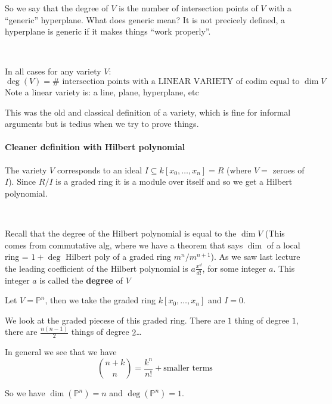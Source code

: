 So we say that the degree of $V$ is the number of intersection points of $V$ with a ``generic'' hyperplane. What does generic mean? It is not precicely defined, a hyperplane is generic if it makes things ``work properly''.

\
\begin{definition}
    In all cases for any variety $V$:\[
        \deg(V) = \# \text{ intersection points with a LINEAR VARIETY of codim equal to }\dim V    
    \]    
    Note a linear variety is: a line, plane, hyperplane, etc
\end{definition}
This was the old and classical definition of a variety, which is fine for informal arguments but is tedius when we try to prove things.

\paragraph*{Cleaner definition with Hilbert polynomial}

\begin{definition}
    The variety $V$ corresponds to an ideal $I\subseteq k[x_0,\ldots,x_n] = R$ (where $V = $ zeroes of $I$). Since $R/I$ is a graded ring it is a module over itself and so we get a Hilbert polynomial.

\

    Recall that the degree of the Hilbert polynomial is equal to the $\dim V$   
    (This comes from commutative alg, where we have a theorem that says $\dim$ of a local ring = $1+\deg$ Hilbert poly of a graded ring $m^n/m^{n+1}$).
As we saw last lecture the leading coefficient of the Hilbert polynomial is $a\frac{x^d}{d!}$, for some integer $a$. This integer $a$ is called the \textbf{degree} of $V$ 
\end{definition}


\begin{example}
    Let $V = \mathbb{P}^n$, then we take the graded ring $k[x_0,\ldots,x_n]$ and $I=0$. 
    
    We look at the graded piecese of this graded ring. There are $1$ thing of degree $1$, there are $\frac{n(n-1)}{2}$ things of degree $2$\dots
    
    In general we see that we have \[\binom{n+k}{n} = \frac{k^n}{n!}+\text{smaller terms}\]

    So we have $\dim(\mathbb{P}^n) = n$ and $\deg(\mathbb{P}^n) = 1$.
\end{example}

